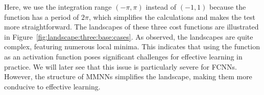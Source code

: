 \documentclass[11pt,a4paper]{article}
\begin{document}
\noindent
Here, we use the integration range \((-\pi, \pi)\) instead of \((-1, 1)\) because the \sine{} function has a period of \(2\pi\), which simplifies the calculations and makes the test more straightforward.
The landscapes of these three cost functions are illustrated in Figure~\ref{fig:landscape:three:base:cases}. As observed, the landscapes are quite complex, featuring numerous local minima. This indicates that using the \sine{} function as an activation function poses significant challenges for effective learning in practice.
We will later see that this issue is particularly severe for FCNNs. However, the structure of MMNNs simplifies the landscape, making them more conducive to effective learning.


\end{document}
